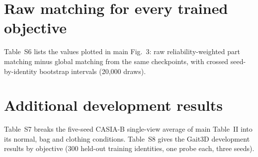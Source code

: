 \documentclass[11pt]{article}
\newcommand{\tablesetup}{\small\setlength{\tabcolsep}{4pt}}
\begin{document}
\begin{table}[!htbp]
\centering
\caption{Raw reliability-weighted part matching on frozen metric-baseline
checkpoints at different local-score weights, Rank-1 (\%).}
\label{tab:s-weights}
{\tablesetup
}
\end{table}

\section{Raw matching for every trained objective}
\label{sec:s-raw}

Table~S6 lists the values plotted in main Fig.~3: raw reliability-weighted
part matching minus global matching from the same checkpoints, with crossed
seed-by-identity bootstrap intervals (20,000 draws).

\begin{table}[!htbp]
\centering
\caption{Raw reliability-weighted part matching minus global matching (Rank-1
points, crossed 95\% intervals), from each training run's own evaluation. The
checkpoint-control analysis in main Table~III re-encodes the metric-baseline
checkpoints and differs from these values by at most 0.05 points.}
\label{tab:s-raw}
{\tablesetup\footnotesize
}
\end{table}

\section{Additional development results}
\label{sec:s-dev}

Table~S7 breaks the five-seed CASIA-B single-view average of main Table~II into
its normal, bag and clothing conditions. Table~S8 gives the Gait3D development
results by objective (300 held-out training identities, one probe each, three
seeds).

\begin{table}[!htbp]
\centering
\caption{CASIA-B development, single-view-gallery protocol excluding identical
views, five seeds (mean $\pm$ seed standard deviation).}
\label{tab:s-single-view}
{\tablesetup\footnotesize
}
\end{table}

\begin{table}[!htbp]
\centering
\caption{Gait3D development Rank-1 (\%), three seeds, 300 probes (mean $\pm$
seed standard deviation where shown).}
\label{tab:s-gait3d-dev}
{\tablesetup
}
\end{table}
\end{document}
